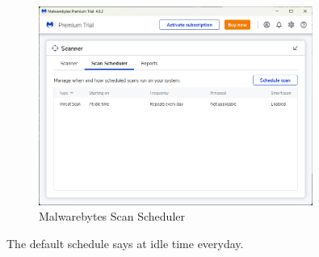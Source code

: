 \documentclass[12pt]{article}
\newenvironment{problem}[2][Problem]{\begin{trivlist}
\item[\hskip \labelsep {\bfseries #1}\hskip \labelsep {\bfseries #2.}]}{\end{trivlist}}
\begin{document}
\begin{problem}{1}
\begin{enumerate}
\begin{figure}[H]
        \includegraphics[width=0.8\textwidth]{schedule}
        \caption{Malwarebytes Scan Scheduler}
    \end{figure}
    The default schedule says at idle time everyday.
\end{enumerate}

\end{problem}
 
\end{document}
